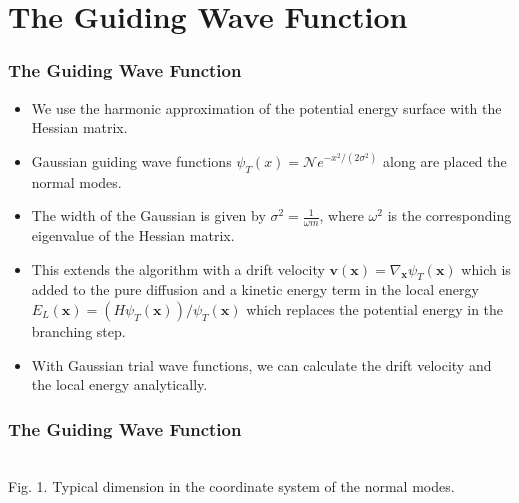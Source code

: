 \documentclass[16pt]{beamer}
\begin{document}
\section{The Guiding Wave Function}
\begin{frame}
\frametitle{The Guiding Wave Function}
\begin{itemize}
\item We use the harmonic approximation of the potential energy surface with the Hessian matrix.
\item Gaussian guiding wave functions $\psi_T(x) = \mathcal{N} e^{-x^2/(2 \sigma^2)}$ along are placed the normal modes.
\item The width of the Gaussian is given by $\sigma^2 = \frac{1}{\omega m}$, where $\omega^2$ is the corresponding eigenvalue of the Hessian matrix.
\item This extends the algorithm with a drift velocity $\bm{v}(\bm{x}) = \nabla_{\bm{x}} \psi_T(\bm{x})$ which is added to the pure diffusion and a kinetic energy term in the local energy $E_L(\bm{x}) = (H\psi_T(\bm{x}))/\psi_T(\bm{x})$ which replaces the potential energy in the branching step.
\item With Gaussian trial wave functions, we can calculate the drift velocity and the local energy analytically.

\end{itemize} 

\end{frame}

\begin{frame}
\frametitle{The Guiding Wave Function}
\begin{center}
\\
Fig. 1. Typical dimension in the coordinate system of the normal modes.
\end{center}

\end{frame}
\end{document}
